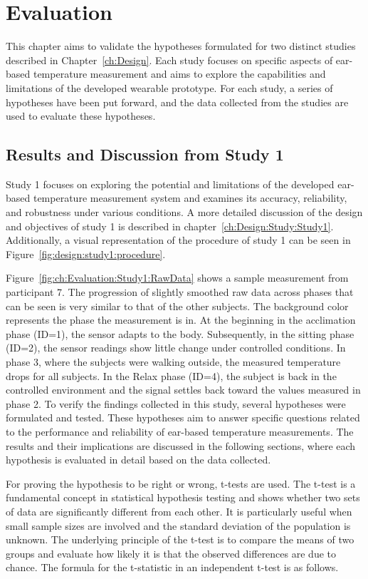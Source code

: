 \chapter{Evaluation}
\label{ch:Evaluation}
This chapter aims to validate the hypotheses formulated for two distinct studies described in Chapter~\ref{ch:Design}. 
Each study focuses on specific aspects of ear-based temperature measurement and aims to explore the capabilities and limitations of the developed wearable prototype. 
For each study, a series of hypotheses have been put forward, and the data collected from the studies are used to evaluate these hypotheses.

\section{Results and Discussion from Study 1}
\label{sec:Evaluation:Study1}
Study 1 focuses on exploring the potential and limitations of the developed ear-based temperature measurement system and examines its accuracy, reliability, and robustness under various conditions. 
A more detailed discussion of the design and objectives of study 1 is described in chapter~\ref{ch:Design:Study:Study1}.
Additionally, a visual representation of the procedure of study 1 can be seen in Figure~\ref{fig:design:study1:procedure}.

Figure~\ref{fig:ch:Evaluation:Study1:RawData} shows a sample measurement from participant 7.
The progression of slightly smoothed raw data across phases that can be seen is very similar to that of the other subjects. 
The background color represents the phase the measurement is in.
At the beginning in the acclimation phase (ID=1), the sensor adapts to the body. 
Subsequently, in the sitting phase (ID=2), the sensor readings show little change under controlled conditions.
In phase 3, where the subjects were walking outside, the measured temperature drops for all subjects.
In the Relax phase (ID=4), the subject is back in the controlled environment and the signal settles back toward the values measured in phase 2.
To verify the findings collected in this study, several hypotheses were formulated and tested. 
These hypotheses aim to answer specific questions related to the performance and reliability of ear-based temperature measurements. 
The results and their implications are discussed in the following sections, where each hypothesis is evaluated in detail based on the data collected.

For proving the hypothesis to be right or wrong, t-tests are used.
The t-test is a fundamental concept in statistical hypothesis testing and shows whether two sets of data are significantly different from each other. 
It is particularly useful when small sample sizes are involved and the standard deviation of the population is unknown.
The underlying principle of the t-test is to compare the means of two groups and evaluate how likely it is that the observed differences are due to chance.
The formula for the t-statistic in an independent t-test is as follows.

